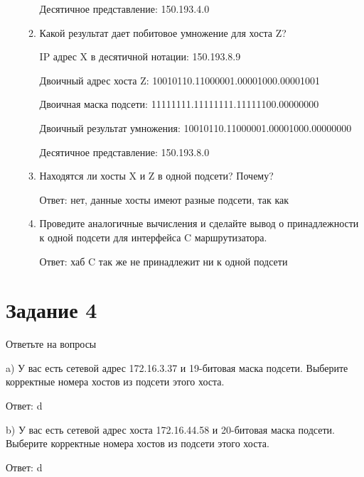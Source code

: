 \documentclass[bachelor, och, labwork]{shiza}
\begin{document}
\begin{enumerate}
\begin{enumerate}
        Десятичное представление: 150.193.4.0

        \item Какой результат дает побитовое умножение для хоста Z?
        
        IP адрес X в десятичной нотации: 150.193.8.9

        Двоичный адрес хоста Z: 10010110.11000001.00001000.00001001

        Двоичная маска подсети: 11111111.11111111.11111100.00000000

        Двоичный результат умножения: 10010110.11000001.00001000.00000000 

        Десятичное представление: 150.193.8.0

        \item Находятся ли хосты X и Z в одной подсети? Почему?
        
        Ответ: нет, данные хосты имеют разные подсети, так как  
        \item Проведите аналогичные вычисления и сделайте вывод о принадлежности к одной подсети для интерфейса C маршрутизатора.
        
        Ответ: хаб C так же не принадлежит ни к одной подсети
    \end{enumerate}
    
\end{enumerate}

\section{Задание 4}

Ответьте на вопросы

a)	У вас есть сетевой адрес 172.16.3.37 и 19-битовая маска подсети. Выберите корректные номера хостов из подсети этого хоста.

Ответ: d

b)	У вас есть сетевой адрес хоста 172.16.44.58 и 20-битовая маска подсети. Выберите корректные номера хостов из подсети этого хоста.

Ответ: d
\end{document}
